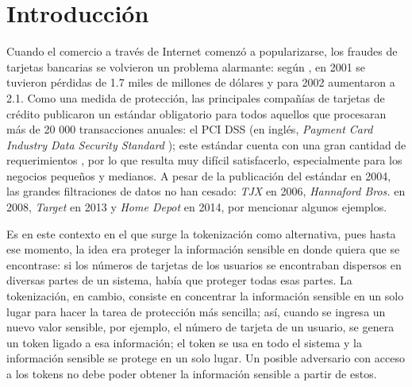 %
%

\section{Introducción}


Cuando el comercio a través de Internet comenzó a popularizarse, los fraudes de
tarjetas bancarias se volvieron un problema alarmante: según \cite{wallethub},
en 2001 se tuvieron pérdidas de 1.7 miles de millones de dólares y para 2002
aumentaron a 2.1. Como una medida de protección, las principales compañías de
tarjetas de crédito publicaron un estándar obligatorio para todos aquellos que
procesaran más de 20 000 transacciones anuales: el PCI DSS (en inglés,
\textit{Payment Card Industry Data Security Standard} \cite{pci_dss}); este
estándar cuenta con una gran cantidad de requerimientos \cite{uk_association}
\cite{search_security}, por lo que resulta muy difícil satisfacerlo, 
especialmente para los negocios pequeños y medianos. A pesar de la publicación
del estándar en 2004, las grandes filtraciones de datos no han cesado:
\textit{TJX} en 2006, \textit{Hannaford Bros.} en 2008, \textit{Target} en
2013 y \textit{Home Depot} en 2014, por mencionar algunos ejemplos.


Es en este contexto en el que surge la tokenización como alternativa, pues hasta
ese momento, la idea era proteger la información sensible en donde
quiera que se encontrase: si los números de tarjetas de los usuarios se
encontraban dispersos en diversas partes de un sistema, había que proteger todas
esas partes. La tokenización, en cambio, consiste en concentrar la información
sensible en un solo lugar para hacer la tarea de protección más sencilla; así,
cuando se ingresa un nuevo valor sensible, por ejemplo, el número de tarjeta
de un usuario, se genera un token ligado a esa información; el token se usa en
todo el sistema y la información sensible se protege en un solo lugar. Un
posible adversario con acceso a los tokens no debe poder obtener la información
sensible a partir de estos.

